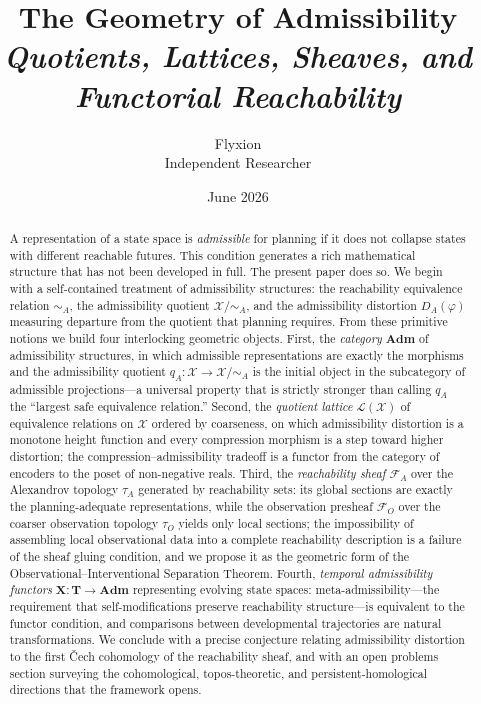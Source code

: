 \documentclass[11pt, a4paper]{article}
\title{%
  \textbf{The Geometry of Admissibility}\\[0.5em]
  {\large\itshape Quotients, Lattices, Sheaves, and Functorial Reachability}%
}
\author{Flyxion\\[0.4em]
\small Independent Researcher}
\date{June 2026}
\theoremstyle{plain}
\theoremstyle{definition}
\theoremstyle{remark}
\newcommand{\calX}{\mathcal{X}}
\newcommand{\calF}{\mathcal{F}}
\newcommand{\calL}{\mathcal{L}}
\newcommand{\simA}{\sim_{\!A}}
\newcommand{\XmodA}{\calX/{\simA}}
\newcommand{\Adm}{\mathbf{Adm}}
\begin{document}
\maketitle

\begin{abstract}
\noindent
A representation of a state space is \emph{admissible} for planning if it
does not collapse states with different reachable futures. This condition
generates a rich mathematical structure that has not been developed in full.
The present paper does so. We begin with a self-contained treatment of
admissibility structures: the reachability equivalence relation $\simA$, the
admissibility quotient $\XmodA$, and the admissibility distortion $D_A(\varphi)$
measuring departure from the quotient that planning requires. From these
primitive notions we build four interlocking geometric objects. First, the
\emph{category} $\Adm$ of admissibility structures, in which admissible
representations are exactly the morphisms and the admissibility quotient
$q_A\colon \calX \to \XmodA$ is the initial object in the subcategory of
admissible projections---a universal property that is strictly stronger than
calling $q_A$ the ``largest safe equivalence relation.'' Second, the
\emph{quotient lattice} $\calL(\calX)$ of equivalence relations on $\calX$
ordered by coarseness, on which admissibility distortion is a monotone height
function and every compression morphism is a step toward higher distortion;
the compression--admissibility tradeoff is a functor from the category of
encoders to the poset of non-negative reals. Third, the \emph{reachability
sheaf} $\calF_A$ over the Alexandrov topology $\tau_A$ generated by reachability
sets: its global sections are exactly the planning-adequate representations,
while the observation presheaf $\calF_O$ over the coarser observation topology
$\tau_O$ yields only local sections; the impossibility of assembling local
observational data into a complete reachability description is a failure of the
sheaf gluing condition, and we propose it as the geometric form of the
Observational--Interventional Separation Theorem. Fourth, \emph{temporal
admissibility functors} $\mathbf{X}\colon \mathbf{T} \to \Adm$ representing
evolving state spaces: meta-admissibility---the requirement that
self-modifications preserve reachability structure---is equivalent to the
functor condition, and comparisons between developmental trajectories are
natural transformations. We conclude with a precise conjecture relating
admissibility distortion to the first \v{C}ech cohomology of the reachability
sheaf, and with an open problems section surveying the cohomological,
topos-theoretic, and persistent-homological directions that the framework opens.
\end{abstract}
\end{document}
